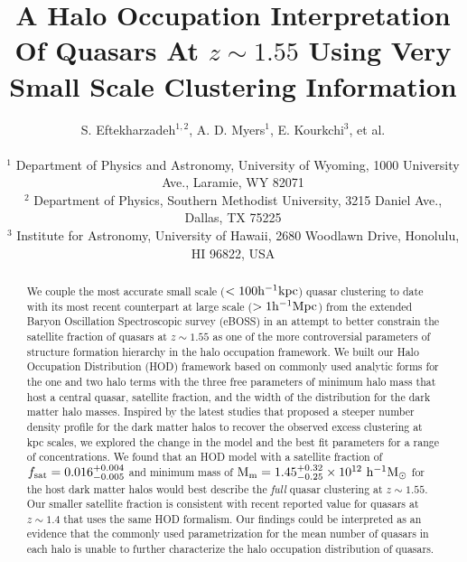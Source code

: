 \documentclass[useAMS,usenatbib]{mn2e}
\begin{document}

\title[Quasar HOD at $z \sim 1.5$]{A Halo Occupation Interpretation Of Quasars At $z\sim1.55$ Using Very Small Scale Clustering Information}
% 
\author[Eftekharzadeh et al.]{S. Eftekharzadeh$^{1,2}$,  A. D. Myers$^{1}$, E. Kourkchi$^{3}$, et al.\\
\\
$^{1}$ Department of Physics and Astronomy, University of Wyoming, 1000 University Ave., Laramie, WY 82071\\
$^{2}$ Department of Physics, Southern Methodist University, 3215 Daniel Ave., Dallas, TX 75225\\
$^{3}$ Institute for Astronomy, University of Hawaii, 2680 Woodlawn Drive, Honolulu, HI 96822, USA}
\maketitle


\begin{abstract}
We couple the most accurate small scale ($< 100 \rm h^{-1}kpc$) quasar clustering 
to date with its most recent counterpart at large scale ($> 1 \rm h^{-1}Mpc$) 
from the extended Baryon Oscillation Spectroscopic survey (eBOSS) in an attempt 
to better constrain the satellite fraction of quasars at $z\sim 1.55$ as one of the more controversial 
parameters of structure formation hierarchy in the halo occupation framework. 
We built our Halo Occupation Distribution (HOD) framework based on commonly 
used analytic forms for the one and two halo terms with the three free 
parameters of minimum halo mass that host a central quasar, satellite fraction, 
and the width of the distribution for the dark matter halo masses. Inspired by 
the latest studies that proposed a steeper number density profile for the dark 
matter halos to recover the observed excess clustering at kpc scales, we 
explored the change in the model and the best fit parameters for a range of 
concentrations. We found that an HOD model with a satellite fraction of $f_{\rm 
sat} = 0.016_{-0.005}^{+0.004}$ and minimum mass of $\rm M_{m} = 
1.45_{-0.25}^{+0.32} \times 10^{12}\, \, \rm h^{-1} M_{\odot}$ for the host dark matter 
halos would best describe the {\it full} quasar clustering at $z \sim 1.55$. Our 
smaller satellite fraction is consistent with recent reported value for 
quasars at $z\sim 1.4$ that uses the same HOD formalism. Our findings could be interpreted as an evidence that the commonly used parametrization for the mean number of quasars in each 
halo is unable to further characterize the halo occupation distribution of 
quasars.   



\end{abstract}
\end{document}
